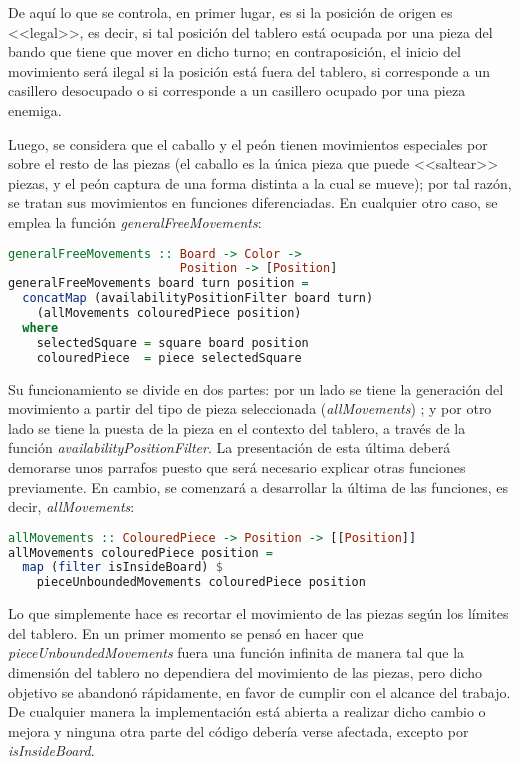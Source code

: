 \documentclass{llncs}
\begin{document}
De aquí lo que se controla, en primer lugar, es si la posición de origen es <<legal>>, es decir, si tal posición del tablero está ocupada por una pieza del bando que tiene que mover en dicho turno; en contraposición, el inicio del movimiento será ilegal si la posición está fuera del tablero, si corresponde a un casillero desocupado o si corresponde a un casillero ocupado por una pieza enemiga.

Luego, se considera que el caballo y el peón tienen movimientos especiales por sobre el resto de las piezas (el caballo es la única pieza que puede <<saltear>> piezas, y el peón captura de una forma distinta a la cual se mueve); por tal razón, se tratan sus movimientos en funciones diferenciadas. En cualquier otro caso, se emplea la función \textit{generalFreeMovements}:


\begin{lstlisting}[frame=single, language=haskell, captionpos=b, caption=Función generalFreeMovements, label={lst:general_free_movements}]
generalFreeMovements :: Board -> Color ->
                        Position -> [Position]
generalFreeMovements board turn position =
  concatMap (availabilityPositionFilter board turn)
    (allMovements colouredPiece position)
  where
    selectedSquare = square board position
    colouredPiece  = piece selectedSquare
\end{lstlisting}

Su funcionamiento se divide en dos partes: por un lado se tiene la generación del movimiento a partir del tipo de pieza seleccionada (\textit{allMovements}) ; y por otro lado se tiene la puesta de la pieza en el contexto del tablero, a través de la función \textit{availabilityPositionFilter}. La presentación de esta última deberá demorarse unos parrafos puesto que será necesario explicar otras funciones previamente. En cambio, se comenzará a desarrollar la última de las funciones, es decir, \textit{allMovements}:

\begin{lstlisting}[frame=single, language=haskell, captionpos=b, caption=Función allMovements, label={lst:all_movements}]
allMovements :: ColouredPiece -> Position -> [[Position]]
allMovements colouredPiece position =
  map (filter isInsideBoard) $
    pieceUnboundedMovements colouredPiece position
\end{lstlisting}

Lo que simplemente hace es recortar el movimiento de las piezas según los límites del tablero. En un primer momento se pensó en hacer que \textit{pieceUnboundedMovements} fuera una función infinita de manera tal que la dimensión del tablero no dependiera del movimiento de las piezas, pero dicho objetivo se abandonó rápidamente, en favor de cumplir con el alcance del trabajo. De cualquier manera la implementación está abierta a realizar dicho cambio o mejora y ninguna otra parte del código debería verse afectada, excepto por \textit{isInsideBoard}.
\end{document}
